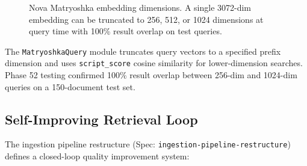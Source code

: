 \documentclass[11pt,letterpaper]{article}
\begin{document}
\begin{figure}[H]
\centering
{}
\caption{Nova Matryoshka embedding dimensions. A single 3072-dim embedding
can be truncated to 256, 512, or 1024 dimensions at query time with
100\% result overlap on test queries.}
\label{fig:matryoshka}
\end{figure}

The \texttt{MatryoshkaQuery} module truncates query vectors to a specified
prefix dimension and uses \texttt{script\_score} cosine similarity for
lower-dimension searches. Phase 52 testing confirmed 100\% result overlap
between 256-dim and 1024-dim queries on a 150-document test set.

\subsection{Self-Improving Retrieval Loop}

The ingestion pipeline restructure (Spec: \texttt{ingestion-pipeline-restructure})
defines a closed-loop quality improvement system:
\end{document}
